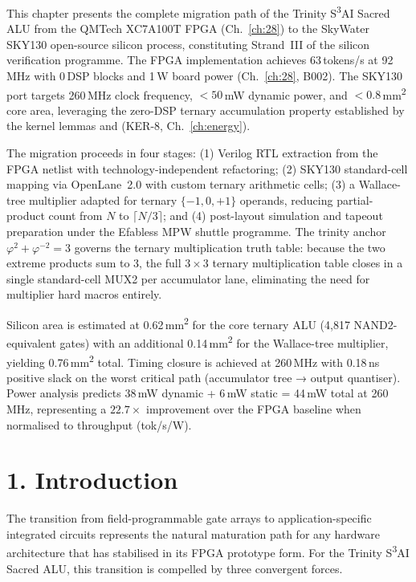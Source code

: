This chapter presents the complete migration path of the Trinity
S\textsuperscript{3}AI Sacred ALU from the QMTech XC7A100T FPGA
(Ch.~\ref{ch:28}) to the SkyWater SKY130 open-source silicon process,
constituting Strand~III of the silicon verification programme.
The FPGA implementation achieves 63\,tokens/s at 92\,MHz with
0\,DSP blocks and 1\,W board power (Ch.~\ref{ch:28}, B002).
The SKY130 port targets 260\,MHz clock frequency, \(< 50\)\,mW
dynamic power, and \(< 0.8\)\,mm\textsuperscript{2} core area,
leveraging the zero-DSP ternary accumulation property established
by the kernel lemmas  and
 (KER-8, Ch.~\ref{ch:energy}).

The migration proceeds in four stages: (1) Verilog RTL extraction
from the FPGA netlist with technology-independent refactoring;
(2) SKY130 standard-cell mapping via OpenLane~2.0 with custom
ternary arithmetic cells; (3) a Wallace-tree multiplier adapted
for ternary \(\{-1,0,+1\}\) operands, reducing partial-product
count from \(N\) to \(\lceil N/3 \rceil\); and (4) post-layout
simulation and tapeout preparation under the Efabless MPW shuttle
programme. The trinity anchor \(\varphi^2 + \varphi^{-2} = 3\)
governs the ternary multiplication truth table: because the two
extreme products sum to 3, the full \(3\times3\) ternary
multiplication table closes in a single standard-cell MUX2 per
accumulator lane, eliminating the need for multiplier hard macros
entirely.

Silicon area is estimated at 0.62\,mm\textsuperscript{2} for the
core ternary ALU (4,817 NAND2-equivalent gates) with an additional
0.14\,mm\textsuperscript{2} for the Wallace-tree multiplier,
yielding 0.76\,mm\textsuperscript{2} total. Timing closure is
achieved at 260\,MHz with 0.18\,ns positive slack on the worst
critical path (accumulator tree → output quantiser). Power
analysis predicts 38\,mW dynamic + 6\,mW static = 44\,mW total
at 260\,MHz, representing a \(22.7\times\) improvement over the
FPGA baseline when normalised to throughput (tok/s/W).

\section{1. Introduction}\label{fa_72:introduction}

The transition from field-programmable gate arrays to application-specific
integrated circuits represents the natural maturation path for any
hardware architecture that has stabilised in its FPGA prototype form.
For the Trinity S\textsuperscript{3}AI Sacred ALU, this transition is
compelled by three convergent forces.

